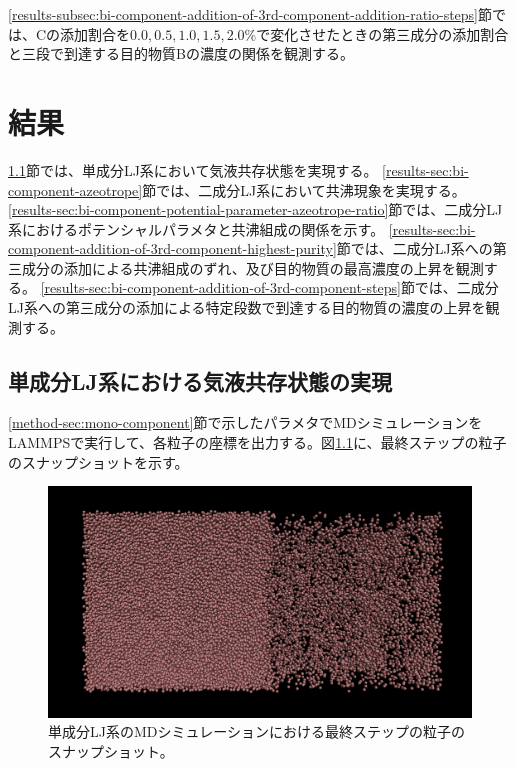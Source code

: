 \documentclass[titlepage]{jsreport}
\begin{document}
\ref{results-subsec:bi-component-addition-of-3rd-component-addition-ratio-steps}節では、Cの添加割合を$0.0,0.5,1.0,1.5,2.0\%$で変化させたときの第三成分の添加割合と三段で到達する目的物質Bの濃度の関係を観測する。


\chapter{結果} \label{chap:results}
\ref{results-sec:mono-component}節では、単成分LJ系において気液共存状態を実現する。
\ref{results-sec:bi-component-azeotrope}節では、二成分LJ系において共沸現象を実現する。
\ref{results-sec:bi-component-potential-parameter-azeotrope-ratio}節では、二成分LJ系におけるポテンシャルパラメタと共沸組成の関係を示す。
\ref{results-sec:bi-component-addition-of-3rd-component-highest-purity}節では、二成分LJ系への第三成分の添加による共沸組成のずれ、及び目的物質の最高濃度の上昇を観測する。
\ref{results-sec:bi-component-addition-of-3rd-component-steps}節では、二成分LJ系への第三成分の添加による特定段数で到達する目的物質の濃度の上昇を観測する。

\section{単成分LJ系における気液共存状態の実現} \label{results-sec:mono-component}
\ref{method-sec:mono-component}節で示したパラメタでMDシミュレーションをLAMMPSで実行して、各粒子の座標を出力する。図\ref{fig:ln78732-rn10976-ld0.629856-rd0.087808-last}に、最終ステップの粒子のスナップショットを示す。
\begin{figure}[htbp]
    \begin{center}
        \includegraphics[width=14cm]{fig/ln78732-rn10976-ld0.629856-rd0.087808/ln78732-rn10976-ld0.629856-rd0.087808-last.png}
    \end{center}
    \caption{単成分LJ系のMDシミュレーションにおける最終ステップの粒子のスナップショット。}
    \label{fig:ln78732-rn10976-ld0.629856-rd0.087808-last}
\end{figure}
\end{document}
